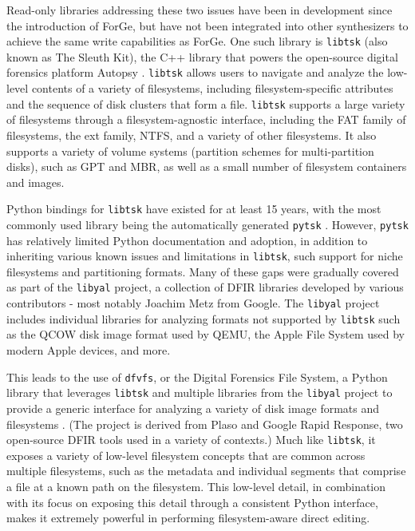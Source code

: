 Read-only libraries addressing these two issues have been in development
since the introduction of ForGe, but have not been integrated into other
synthesizers to achieve the same write capabilities as ForGe. One such
library is \passthrough{\lstinline!libtsk!} (also known as The Sleuth
Kit), the C++ library that powers the open-source digital forensics
platform Autopsy \cite{SleuthkitSleuthkit2025}.
\passthrough{\lstinline!libtsk!} allows users to navigate and analyze
the low-level contents of a variety of filesystems, including
filesystem-specific attributes and the sequence of disk clusters that
form a file. \passthrough{\lstinline!libtsk!} supports a large variety
of filesystems through a filesystem-agnostic interface, including the
FAT family of filesystems, the ext family, NTFS, and a variety of other
filesystems. It also supports a variety of volume systems (partition
schemes for multi-partition disks), such as GPT and MBR, as well as a
small number of filesystem containers and images.

Python bindings for \passthrough{\lstinline!libtsk!} have existed for at
least 15 years, with the most commonly used library being the
automatically generated \passthrough{\lstinline!pytsk!}
\cite{Py4n6Pytsk2025}. However, \passthrough{\lstinline!pytsk!} has
relatively limited Python documentation and adoption, in addition to
inheriting various known issues and limitations in
\passthrough{\lstinline!libtsk!}, such support for niche filesystems and
partitioning formats. Many of these gaps were gradually covered as part
of the \passthrough{\lstinline!libyal!} project, a collection of DFIR
libraries developed by various contributors - most notably Joachim Metz
from Google. The \passthrough{\lstinline!libyal!} project includes
individual libraries for analyzing formats not supported by
\passthrough{\lstinline!libtsk!} such as the QCOW disk image format used
by QEMU, the Apple File System used by modern Apple devices, and more.

This leads to the use of \passthrough{\lstinline!dfvfs!}, or the Digital
Forensics File System, a Python library that leverages
\passthrough{\lstinline!libtsk!} and multiple libraries from the
\passthrough{\lstinline!libyal!} project to provide a generic interface
for analyzing a variety of disk image formats and filesystems
\cite{Log2timelineDfvfs2025}. (The project is derived from Plaso and
Google Rapid Response, two open-source DFIR tools used in a variety of
contexts.) Much like \passthrough{\lstinline!libtsk!}, it exposes a
variety of low-level filesystem concepts that are common across multiple
filesystems, such as the metadata and individual segments that comprise
a file at a known path on the filesystem. This low-level detail, in
combination with its focus on exposing this detail through a consistent
Python interface, makes it extremely powerful in performing
filesystem-aware direct editing.

